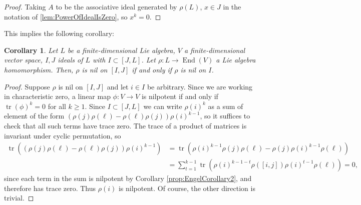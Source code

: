\documentclass[10pt]{amsart}
\newtheorem{cor}[thm]{Corollary}
\theoremstyle{definition}
\theoremstyle{remark}
\numberwithin{equation}{section}
\DeclareMathOperator{\End}{End}
\DeclareMathOperator{\tr}{tr}
\begin{document}
\begin{proof}
Taking $A$ to be the associative ideal generated by $\rho(L)$, $x \in J$ in the notation of \ref{lem:PowerOfIdealIsZero}, so $x^{k} = 0$.

\end{proof}

This implies the following corollary:
\begin{cor} \label{cor:EngelCorollary3}
Let $L$ be a finite-dimensional Lie algebra, $V$ a finite-dimensional vector space, $I,J$ ideals of $L$ with $I \subset [J,L]$. Let $\rho: L \to \End(V)$ a Lie algebra homomorphism. Then, $\rho$ is nil on $[I,J]$ if and only if $\rho$ is nil on $I$.
\end{cor}
\begin{proof}
Suppose $\rho$ is nil on $[I,J]$ and let $i \in I$ be arbitrary. Since we are working in characteristic zero, a linear map $\phi: V \to V$ is nilpotent if and only if $\tr(\phi)^k = 0$ for all $k \geq 1$. Since $I \subset [J,L]$ we can write $\rho(i)^{k}$ as a sum of element of the form $(\rho(j)\rho(\ell) - \rho(\ell) \rho(j))\rho(i)^{k-1}$, so it suffices to check that all such terms have trace zero. The trace of a product of matrices is invariant under cyclic permutation, so
\begin{align*}
\tr((\rho(j)\rho(\ell) - \rho(\ell) \rho(j))\rho(i)^{k-1}) & = 
\tr(\rho(i)^{k-1}\rho(j)\rho(\ell) - \rho(j)\rho(i)^{k-1}\rho(\ell)) \\
& = \sum_{t=1}^{k-1}\tr(\rho(i)^{k-1 - t}\rho([i,j])\rho(i)^{t-1}\rho(\ell)) = 0,
\end{align*}
since each term in the sum is nilpotent by Corollary \ref{prop:EngelCorollary2}, and therefore has trace zero. Thus $\rho(i)$ is nilpotent. Of course, the other direction is trivial.
\end{proof}
\end{document}
